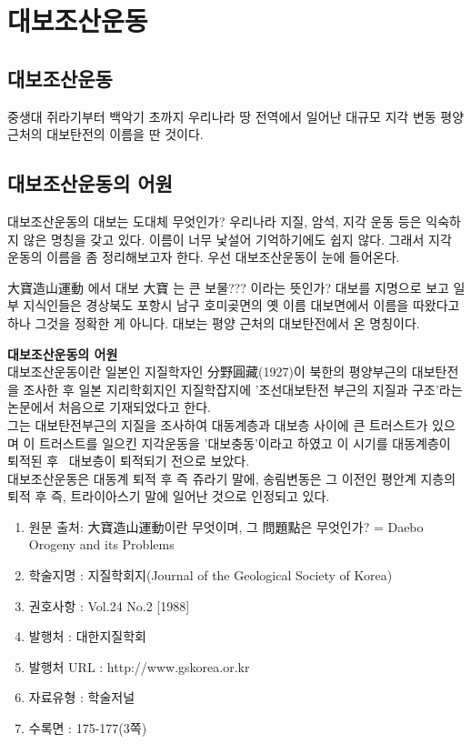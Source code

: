 \documentclass[12pt,a4paper]{book}
\newcommand{\SectionMargin}			{\newpage  \null \vskip 0cm}
\newcommand{\SubSectionMargin}		{\newpage  \null \vskip 0cm}
\begin{document}
	\SectionMargin
	\section{	대보조산운동}

		\subsection{대보조산운동}

		중생대 쥐라기부터 백악기 초까지 우리나라 땅 전역에서 일어난 대규모 지각 변동
		평양 근처의 대보탄전의 이름을 딴 것이다.


		\subsection{대보조산운동의 어원}

		대보조산운동의 대보는 도대체 무엇인가?
		우리나라 지질, 암석, 지각 운동 등은 익숙하지 않은 명칭을 갖고 있다. 
		이름이 너무 낯설어 기억하기에도 쉽지 않다.  
		그래서 지각 운동의 이름을 좀 정리해보고자 한다. 우선 대보조산운동이 눈에 들어온다. 

		大寶造山運動 에서 대보 大寶 는 큰 보물??? 이라는 뜻인가?
		대보를 지명으로 보고 일부 지식인들은 경상북도 포항시 남구 호미곶면의 옛 이름 대보면에서 이름을 따왔다고 하나 그것을 정확한 게 아니다. 
		대보는 평양 근처의 대보탄전에서 온 명칭이다.

		\SubSectionMargin
		\textbf{대보조산운동의 어원}
		\\[-1.0em]

		대보조산운동이란 일본인 지질학자인 分野圓藏(1927)이 북한의 평양부근의 대보탄전을 조사한 후 
		일본 지리학회지인 지질학잡지에 '조선대보탄전 부근의 지질과 구조'라는 논문에서 처음으로 기재되었다고 한다. 
		\\[-1.0em]

		그는 대보탄전부근의 지질을 조사하여 대동계층과 대보층 사이에 큰 트러스트가 있으며 
		이 트러스트를 일으킨 지각운동을 '대보충동'이라고 하였고 이 시기를 대동계층이 퇴적된 후~ 대보층이 퇴적되기 전으로 보았다. 
		\\[-1.0em]

		대보조산운동은 대동계 퇴적 후 즉 쥬라기 말에, 송림변동은 그 이전인 평안계 지층의 퇴적 후 즉, 트라이아스기 말에 일어난 것으로 인정되고 있다. 

		
		\begin{enumerate}[itemsep=-1.0em]
		\item[] 원문 출처: 大寶造山運動이란 무엇이며, 그 問題點은 무엇인가? = Daebo Orogeny and its Problems 
		\item[] 학술지명 : 지질학회지(Journal of the Geological Society of Korea) 
		\item[] 권호사항 : Vol.24 No.2 [1988] 
		\item[] 발행처 : 대한지질학회 
		\item[] 발행처 URL : http://www.gskorea.or.kr 
		\item[] 자료유형 : 학술저널 
		\item[] 수록면 : 175-177(3쪽)
		\end{enumerate}
\end{document}
